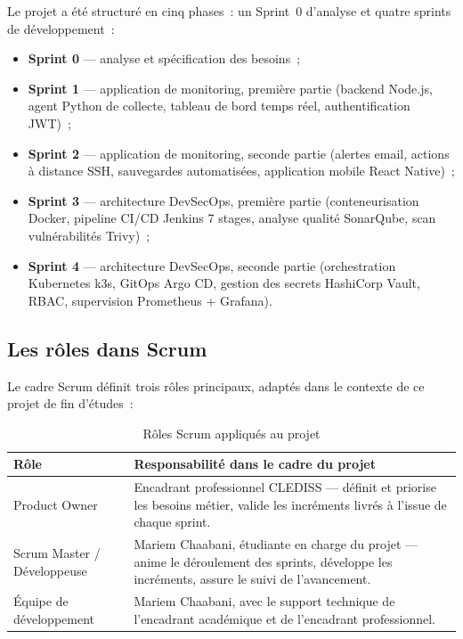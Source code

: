 Le projet a été structuré en cinq phases~: un Sprint~0 d'analyse et quatre sprints de développement~:

\begin{itemize}
  \item \textbf{Sprint 0} — analyse et spécification des besoins~;
  \item \textbf{Sprint 1} — application de monitoring, première partie (backend Node.js, agent Python de collecte, tableau de bord temps réel, authentification JWT)~;
  \item \textbf{Sprint 2} — application de monitoring, seconde partie (alertes email, actions à distance SSH, sauvegardes automatisées, application mobile React Native)~;
  \item \textbf{Sprint 3} — architecture DevSecOps, première partie (conteneurisation Docker, pipeline CI/CD Jenkins 7 stages, analyse qualité SonarQube, scan vulnérabilités Trivy)~;
  \item \textbf{Sprint 4} — architecture DevSecOps, seconde partie (orchestration Kubernetes k3s, GitOps Argo CD, gestion des secrets HashiCorp Vault, RBAC, supervision Prometheus + Grafana).
\end{itemize}

\subsection{Les rôles dans Scrum}

Le cadre Scrum définit trois rôles principaux, adaptés dans le contexte de ce projet de fin d'études~:

\begin{table}[H]
\centering
\caption{Rôles Scrum appliqués au projet}
\begin{tabularx}{\linewidth}{@{}l X@{}}
\toprule
\textbf{Rôle} & \textbf{Responsabilité dans le cadre du projet} \\
\midrule
Product Owner & Encadrant professionnel CLEDISS — définit et priorise les besoins métier, valide les incréments livrés à l'issue de chaque sprint. \\
Scrum Master / Développeuse & Mariem Chaabani, étudiante en charge du projet — anime le déroulement des sprints, développe les incréments, assure le suivi de l'avancement. \\
Équipe de développement & Mariem Chaabani, avec le support technique de l'encadrant académique et de l'encadrant professionnel. \\
\bottomrule
\end{tabularx}
\end{table}

